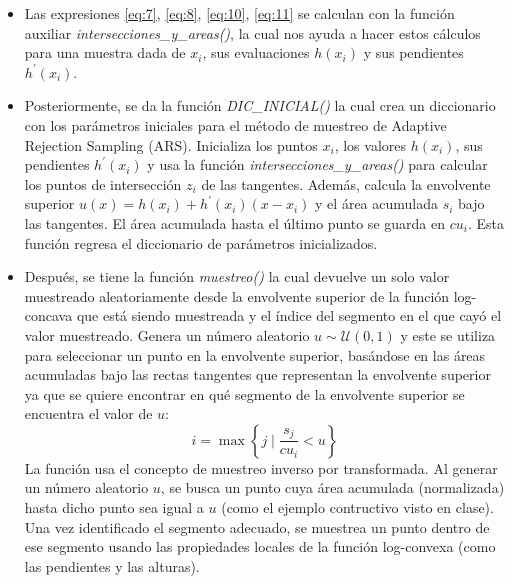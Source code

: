 \begin{itemize}
\item Las expresiones \eqref{eq:7}, \eqref{eq:8}, \eqref{eq:10}, \eqref{eq:11} se calculan con la función auxiliar \textit{intersecciones\_y\_areas()}, la cual nos ayuda a hacer estos cálculos para una muestra dada de $x_i$, sus evaluaciones $h(x_i)$ y sus pendientes $h^{'}(x_i)$. 

\item Posteriormente, se da la función \textit{DIC\_INICIAL()} la cual crea un diccionario con los parámetros iniciales para el método de muestreo de Adaptive Rejection Sampling (ARS).
Inicializa los puntos $x_i$, los valores $h(x_i)$, sus pendientes $h^{'}(x_i)$ y usa la función \textit{intersecciones\_y\_areas()} para calcular los puntos de intersección $z_i$ de las tangentes. Además, calcula la envolvente superior $u(x) = h(x_i) + h^{'}(x_i) (x - x_i)$ y el área acumulada $s_i$ bajo las tangentes. El área acumulada hasta el último punto se guarda en $cu_i$. Esta función regresa el diccionario de parámetros inicializados.

\item Después, se tiene la función \textit{muestreo()} la cual devuelve un solo valor muestreado aleatoriamente desde la envolvente superior de la función log-concava que está siendo muestreada y el índice del segmento en el que cayó el valor muestreado. Genera un número aleatorio $u\sim\mathcal{U}(0,1)$ y este se utiliza para seleccionar un punto en la envolvente superior, basándose en las áreas acumuladas bajo las rectas tangentes que representan la envolvente superior ya que se quiere encontrar en qué segmento de la envolvente superior se encuentra el valor de $u$:
\begin{equation} \label{eq:12}
	i = \max \left\{ j \mid \frac{s_j}{cu_{i}} < u \right\}
\end{equation}
La función usa el concepto de muestreo inverso por transformada. Al generar un número aleatorio  $u$, se busca un punto cuya área acumulada (normalizada) hasta dicho punto sea igual a $u$ (como el ejemplo contructivo visto en clase). Una vez identificado el segmento adecuado, se muestrea un punto dentro de ese segmento usando las propiedades locales de la función log-convexa (como las pendientes y las alturas).


\end{itemize}
